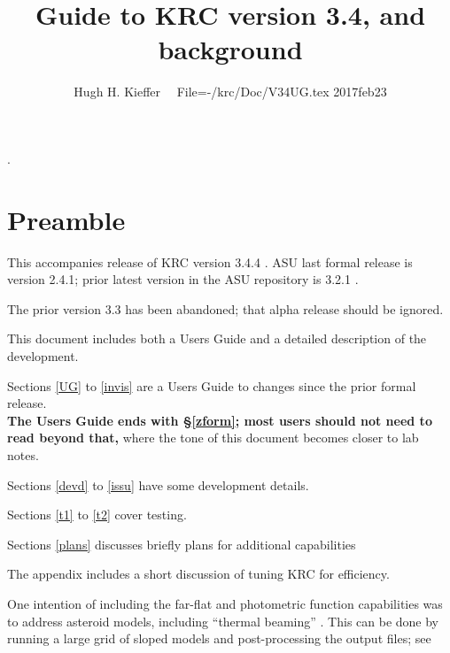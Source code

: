\documentclass{article}
\title{Guide to KRC version 3.4, and background }
\author{Hugh H. Kieffer  \ \ File=-/krc/Doc/V34UG.tex  2017feb23}
\begin{document}
\maketitle
\tableofcontents
\listoffigures
\hrulefill .\hrulefill

\section{Preamble}
This accompanies release of KRC version 3.4.4 . ASU last formal
release is version 2.4.1; prior latest version in the ASU repository is 3.2.1 .

The prior version 3.3 has been abandoned; that alpha release should be ignored.

This document includes both a Users Guide and a detailed description of the development.

Sections \ref{UG} to \ref{invis} are a Users Guide to changes since the prior formal release.
\\ \textbf{ The Users Guide ends with  \S \ref{zform}; most users should not need to read beyond that,} where the tone of this document becomes closer to lab notes.  

Sections \ref{devd} to \ref{issu} have some development details.
 
Sections \ref{t1} to \ref{t2} cover testing.

Sections \ref{plans} discusses briefly plans for additional capabilities

The appendix includes a short discussion of tuning KRC for efficiency. 

One intention of including the far-flat and photometric function capabilities was
to address asteroid models, including ``thermal beaming'' . This can be done by
running a large grid of sloped models and post-processing the output files; see
 
\end{document}
